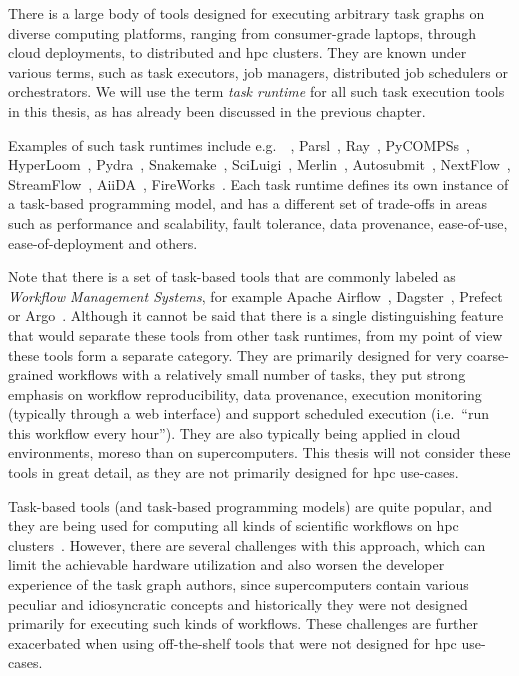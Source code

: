 There is a large body of tools designed for executing arbitrary task graphs on diverse computing
platforms, ranging from consumer-grade laptops, through cloud deployments, to distributed and
\gls{hpc} clusters. They are known under various terms, such as task executors, job managers, distributed
job schedulers or orchestrators. We will use the term \emph{task runtime} for all such task execution tools
in this thesis, as has already been discussed in the previous chapter.

Examples of such task runtimes include e.g.\ \dask{}~\cite{dask},
Parsl~\cite{parsl}, Ray~\cite{ray},
PyCOMPSs~\cite{pycompss}, HyperLoom~\cite{hyperloom},
Pydra~\cite{pydra}, Snakemake~\cite{snakemake},
SciLuigi~\cite{sciluigi}, Merlin~\cite{merlin},
Autosubmit~\cite{autosubmit}, NextFlow~\cite{nextflow},
StreamFlow~\cite{streamflow}, AiiDA~\cite{aiida},
FireWorks~\cite{fireworks}. Each task
runtime defines its own instance of a task-based programming model, and has a different set of
trade-offs in areas such as performance and scalability, fault tolerance, data provenance,
ease-of-use, ease-of-deployment and others.

Note that there is a set of task-based tools that are commonly labeled as \emph{Workflow Management Systems},
for example Apache Airflow~\cite{airfow}, Dagster~\cite{dagster}, Prefect~\cite{prefect} or Argo~\cite{argo}.
Although it cannot be said that there is a single distinguishing feature that would separate these tools from other task
runtimes, from my point of view these tools form a separate category. They are primarily designed for very coarse-grained
workflows with a relatively small number of tasks, they put strong emphasis on workflow reproducibility, data provenance, execution
monitoring (typically through a web interface) and support scheduled execution (i.e.\ ``run this workflow every hour'').
They are also typically being applied in cloud environments, moreso than on supercomputers.
This thesis will not consider these tools in great detail, as they are not primarily
designed for \gls{hpc} use-cases.

Task-based tools (and task-based programming models) are quite popular, and they are being used for
computing all kinds of scientific workflows on \gls{hpc}
clusters~\cite{hpc_tasks, hpc_tasks_2, hpc_tasks_3, pegasus}. However, there are several challenges with this approach,
which can limit the achievable hardware utilization and also worsen the developer experience of the
task graph authors, since supercomputers contain various peculiar and idiosyncratic concepts and
historically they were not designed primarily for executing such kinds of workflows. These
challenges are further exacerbated when using off-the-shelf tools that were not designed for
\gls{hpc} use-cases.

